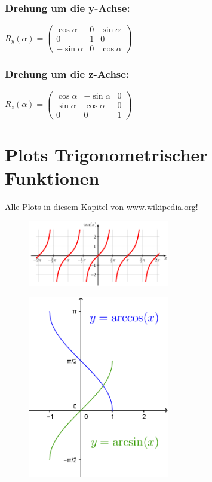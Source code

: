 \subsubsection{Drehung um die y-Achse:}
$R_y(\alpha) = \begin{pmatrix}
\cos \alpha  & 0 & \sin \alpha \\
   0         & 1 &  0          \\
-\sin \alpha & 0 & \cos \alpha
\end{pmatrix}$
\subsubsection{Drehung um die z-Achse:}
$R_z(\alpha) = \begin{pmatrix}
\cos \alpha & -\sin \alpha & 0 \\
\sin \alpha &  \cos \alpha & 0 \\
   0        &  0           & 1
\end{pmatrix}$


\section{Plots Trigonometrischer Funktionen}
Alle Plots in diesem Kapitel von www.wikipedia.org!

\begin{figure}[H] 
\centering
    {\includegraphics[width=0.55\textwidth]{images/tan.png}}
\end{figure}

\begin{figure}[H] 
\centering
    {\includegraphics[width=0.55\textwidth]{images/asinacos.png}}
\end{figure}

